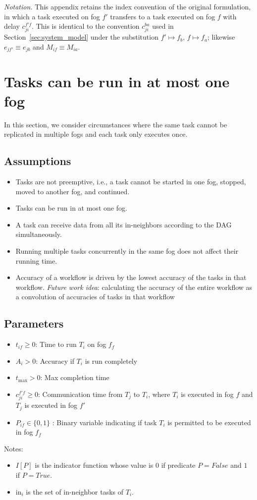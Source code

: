 \noindent\textit{Notation.} This appendix retains the index convention of the original
formulation, in which a task executed on fog $f'$ transfers to a task executed on fog $f$ with
delay $c_{ji}^{f'f}$. This is identical to the convention $c_{ji}^{ba}$ used in
Section~\ref{sec:system_model} under the substitution $f' \mapsto f_b$, $f \mapsto f_a$; likewise
$e_{jf'} \equiv e_{jb}$ and $M_{if} \equiv M_{ia}$.

\section{Tasks can be run in at most one fog }
In this section, we consider circumstances where the same task cannot be replicated in multiple fogs and each task only executes once. 

\subsection{Assumptions}
\begin{itemize}
    \item Tasks are not preemptive, i.e., a task cannot be started in one fog, stopped, moved to another fog, and continued.
    \item Tasks can be run in at most one fog.
    \item A task can receive data from all its in-neighbors  according to the DAG simultaneously.
    \item Running multiple tasks concurrently in the same fog does not affect their running time.
    \item Accuracy of a workflow is driven by the lowest accuracy of the tasks in that workflow. \textit{Future work idea}: calculating the accuracy of the entire workflow as a convolution of accuracies of tasks in that workflow 
\end{itemize}


\subsection{Parameters}
\begin{itemize}
    \item $t_{if} \geq 0$: Time to run $T_i$ on fog $f_f$
    \item $A_i > 0$: Accuracy if $T_i$ is run completely
    \item $t_{\max} >0$: Max completion time
    \item $c_{ji}^{f'f} \geq 0$: Communication time from $T_j$ to $T_i$, where $T_i$ is executed in fog $f$ and $T_j$ is executed in fog $f'$
    \item $P_{if} \in \{0,1\}$ : Binary variable indicating if task $T_i$ is permitted to be executed in fog $f_f$ 
\end{itemize}
Notes: 
\begin{itemize}
    \item $I[P]$ is the indicator function whose value is $0$ if predicate $P=False$ and $1$ if $P=True$.
    \item $\text{in}_i$ is the set of in-neighbor tasks of $T_i$.
\end{itemize}

